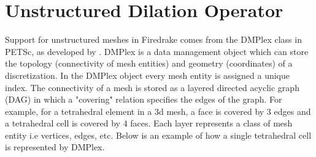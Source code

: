 \documentclass[12 pt]{report}
\begin{document}
\section{Unstructured Dilation Operator}
Support for unstructured meshes in Firedrake comes from the DMPlex class in PETSc, as developed by \citet{lange_flexible_2015}. DMPlex is a data management object which can store the topology (connectivity of mesh entities) and geometry (coordinates) of a discretization. In the DMPlex object every mesh entity is assigned a unique index. The connectivity of a mesh is stored as a layered directed acyclic graph (DAG) in which a "covering" relation specifies the edges of the graph. For example, for a tetrahedral element in a 3d mesh, a face is covered by 3 edges and a tetrahedral cell is covered by 4 faces. Each layer represents a class of mesh entity i.e vertices, edges, etc. Below is an example of how a single tetrahedral cell is represented by DMPlex.
\end{document}
